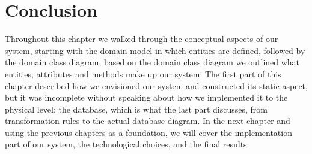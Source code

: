 \documentclass[]{uc2pfecaneva}
\begin{document}
    \raggedright\section{Conclusion}
    Throughout this chapter we walked through the conceptual aspects of our system, starting with the domain model in which entities are defined, followed by the domain class diagram; based on the domain class diagram we outlined what entities, attributes and methods make up our system.
    The first part of this chapter described how we envisioned our system and constructed its static aspect, but it was incomplete without speaking about how we implemented it to the physical level: the database, which is what the last part discusses, from transformation rules to the actual database diagram.
    In the next chapter and using the previous chapters as a foundation, we will cover the implementation part of our system, the technological choices, and the final results.
\end{document}
